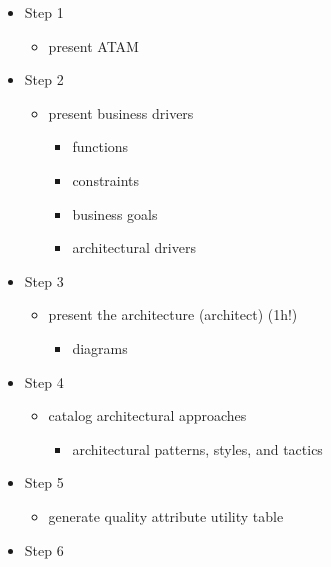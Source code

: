 \begin{itemize}
\tightlist
\item
  Step 1

  \begin{itemize}
  \tightlist
  \item
    present ATAM
  \end{itemize}
\item
  Step 2

  \begin{itemize}
  \tightlist
  \item
    present business drivers

    \begin{itemize}
    \tightlist
    \item
      functions
    \item
      constraints
    \item
      business goals
    \item
      architectural drivers
    \end{itemize}
  \end{itemize}
\item
  Step 3

  \begin{itemize}
  \tightlist
  \item
    present the architecture (architect) (1h!)

    \begin{itemize}
    \tightlist
    \item
      diagrams
    \end{itemize}
  \end{itemize}
\item
  Step 4

  \begin{itemize}
  \tightlist
  \item
    catalog architectural approaches

    \begin{itemize}
    \tightlist
    \item
      architectural patterns, styles, and tactics
    \end{itemize}
  \end{itemize}
\item
  Step 5

  \begin{itemize}
  \tightlist
  \item
    generate quality attribute utility table
  \end{itemize}
\item
  Step 6


\end{itemize}
